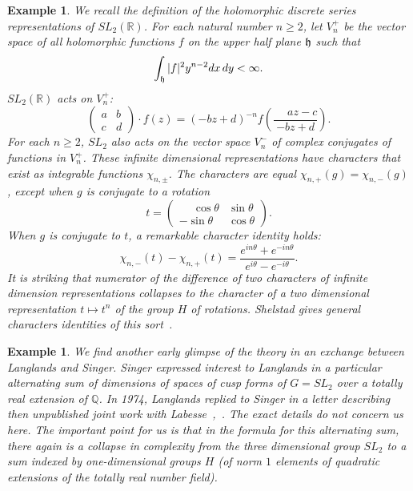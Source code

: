 \documentclass[brochure,english,12pt]{bourbaki}
\newtheorem{example}[equation]{Example}
\newcommand{\ring}[1]{\mathbb{#1}}
\begin{document}
\begin{example}  We recall the definition of the holomorphic discrete series representations
of $SL_2(\ring{R})$.  For each natural number $n\ge 2$, let $V^+_n$ be the vector space
of all holomorphic functions $f$ on the upper half plane ${\frak h}$ such that
\[
\int_{\frak h} |f|^2 y^{n-2} dx\, dy < \infty.
\]
$SL_2(\ring{R})$ acts on $V^+_n$:
\[
\begin{pmatrix} a & b \\ c & d \end{pmatrix} \cdot f(z) = 
(-b z + d ) ^{-n} f (\frac{\phantom{-}a z - c}{-b z + d}).
\]
For each $n\ge 2$, $SL_2$ also acts on the vector space $V^-_n$ of
complex conjugates of functions in $V^+_n$.  These infinite
dimensional representations have characters that exist as integrable
functions $\chi_{n,\pm}$.  The characters are equal
$\chi_{n,+}(g)=\chi_{n,-}(g)$, except when $g$ is conjugate to a
rotation
\[
t = \begin{pmatrix} \phantom{-}\cos\theta & \sin\theta \\ -\sin\theta & \cos\theta\end{pmatrix}.
\] 
When $g$ is conjugate to $t$, a remarkable character identity holds:
\[
\chi_{n,-}(t) - \chi_{n,+}(t) = 
\frac{e^{i n \theta} + e^{- i n \theta}}{e^{i\theta}-e^{-i\theta}}.
\]
It is striking that numerator of the difference of two characters of
infinite dimension representations collapses to the character of a two
dimensional representation $t\mapsto t^n$ of the group $H$ of
rotations.  Shelstad gives general characters identities of this
sort~\cite{Sh}.
\end{example}

\begin{example}
  We find another early glimpse of the theory in an exchange
  between Langlands and Singer.  Singer expressed interest to
  Langlands in a particular alternating sum of dimensions of spaces of
  cusp forms of $G=SL_2$ over a totally real extension of
  $\ring{Q}$.  In 1974, Langlands replied to Singer in a letter
  describing then unpublished joint work with
  Labesse~\cite{Singer},~\cite{LL}.  The exact details do not concern
  us here.  The important point for us is that in the formula for this
  alternating sum, there again is a collapse in complexity from the
  three dimensional group $SL_2$ to a sum indexed by one-dimensional
  groups $H$ (of norm $1$ elements of quadratic extensions of the totally real number field).
\end{example}
\end{document}
